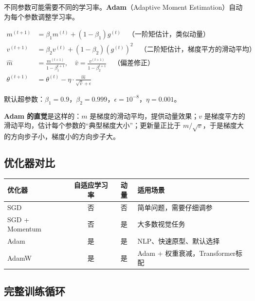 不同参数可能需要不同的学习率。\textbf{Adam}（Adaptive Moment Estimation）自动为每个参数调整学习率。

\begin{keyformula}[title=Adam 优化器]
\begin{align}
m^{(t+1)} &= \beta_1 m^{(t)} + (1 - \beta_1) g^{(t)} \quad \text{（一阶矩估计，类似动量）} \\
v^{(t+1)} &= \beta_2 v^{(t)} + (1 - \beta_2) (g^{(t)})^2 \quad \text{（二阶矩估计，梯度平方的滑动平均）} \\[5pt]
\hat{m} &= \frac{m^{(t+1)}}{1 - \beta_1^{t+1}}, \quad \hat{v} = \frac{v^{(t+1)}}{1 - \beta_2^{t+1}} \quad \text{（偏差修正）} \\[5pt]
\theta^{(t+1)} &= \theta^{(t)} - \eta \cdot \frac{\hat{m}}{\sqrt{\hat{v}} + \epsilon}
\end{align}

默认超参数：$\beta_1 = 0.9$，$\beta_2 = 0.999$，$\epsilon = 10^{-8}$，$\eta = 0.001$。
\end{keyformula}

\textbf{Adam 的直觉}是这样的：$m$ 是梯度的滑动平均，提供动量效果；$v$ 是梯度平方的滑动平均，估计每个参数的``典型梯度大小''；更新量正比于 $m/\sqrt{v}$，于是梯度大的方向步子小，梯度小的方向步子大。

\subsection{优化器对比}

\begin{center}
\renewcommand{\arraystretch}{1.4}
\small
\begin{tabularx}{\textwidth}{lccX}
\toprule
\textbf{优化器} & \textbf{自适应学习率} & \textbf{动量} & \textbf{适用场景} \\
\midrule
SGD & 否 & 否 & 简单问题，需要仔细调参 \\
SGD + Momentum & 否 & 是 & 大多数视觉任务 \\
Adam & 是 & 是 & NLP、快速原型、默认选择 \\
AdamW & 是 & 是 & Adam + 权重衰减，Transformer标配 \\
\bottomrule
\end{tabularx}
\end{center}


\subsection{完整训练循环}

